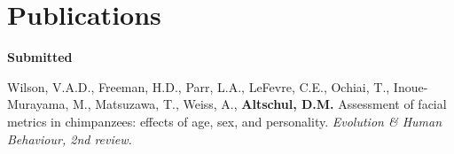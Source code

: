 \documentclass[margin,line]{res}
\newenvironment{list1}{
  \begin{list}{\ding{113}}{%
      \setlength{\itemsep}{0in}
      \setlength{\parsep}{0in} \setlength{\parskip}{0in}
      \setlength{\topsep}{0in} \setlength{\partopsep}{0in} 
      \setlength{\leftmargin}{0.17in}}}{\end{list}}
\begin{document}
\begin{resume}
\begin{list1}
\end{list1}

\vspace{0.7cm}



%
%
% 
%
%



\section{\sc Publications} 

%
%
%
%
%
%
%
%

{\bf Submitted}

Wilson, V.A.D., Freeman, H.D., Parr, L.A., LeFevre, C.E., Ochiai, T., Inoue-Murayama, M., Matsuzawa, T., Weiss, A., {\bf Altschul, D.M.} Assessment of facial metrics in chimpanzees: effects of age, sex, and personality. {\it Evolution \& Human Behaviour, 2nd review.}


\end{resume}
\end{document}
